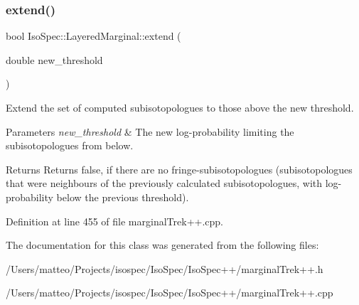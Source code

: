 \subsubsection{\texorpdfstring{extend()}{extend()}}
{\footnotesize\ttfamily bool Iso\+Spec\+::\+Layered\+Marginal\+::extend (\begin{DoxyParamCaption}\item[{double}]{new\+\_\+threshold }\end{DoxyParamCaption})}



Extend the set of computed subisotopologues to those above the new threshold. 


\begin{DoxyParams}{Parameters}
{\em new\+\_\+threshold} & The new log-\/probability limiting the subisotopologues from below. \\
\hline
\end{DoxyParams}
\begin{DoxyReturn}{Returns}
Returns false, if there are no fringe-\/subisotopologues (subisotopologues that were neighbours of the previously calculated subisotopologues, with log-\/probability below the previous threshold). 
\end{DoxyReturn}


Definition at line 455 of file marginal\+Trek++.\+cpp.



The documentation for this class was generated from the following files\+:\begin{DoxyCompactItemize}
\item 
/\+Users/matteo/\+Projects/isospec/\+Iso\+Spec/\+Iso\+Spec++/marginal\+Trek++.\+h\item 
/\+Users/matteo/\+Projects/isospec/\+Iso\+Spec/\+Iso\+Spec++/marginal\+Trek++.\+cpp\end{DoxyCompactItemize}
